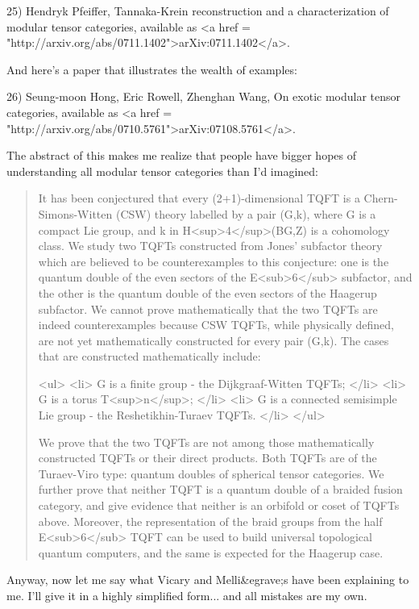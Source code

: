 25) Hendryk Pfeiffer, Tannaka-Krein reconstruction and a 
characterization of modular tensor categories, available as
<a href = "http://arxiv.org/abs/0711.1402">arXiv:0711.1402</a>.

And here's a paper that illustrates the wealth of examples:

26)  Seung-moon Hong, Eric Rowell, Zhenghan Wang, On exotic modular
tensor categories, available as <a href = "http://arxiv.org/abs/0710.5761">arXiv:07108.5761</a>.

The abstract of this makes me realize that people have bigger hopes of
understanding all modular tensor categories than I'd imagined:

\begin{quote}
  It has been conjectured that every (2+1)-dimensional TQFT is a
  Chern-Simons-Witten (CSW) theory labelled by a pair (G,k), where G
  is a compact Lie group, and k in H<sup>4</sup>(BG,Z) is a cohomology
  class.  We study two TQFTs constructed from Jones' subfactor theory
  which are believed to be counterexamples to this conjecture: one is
  the quantum double of the even sectors of the E<sub>6</sub>
  subfactor, and the other is the quantum double of the even sectors
  of the Haagerup subfactor. We cannot prove mathematically that the
  two TQFTs are indeed counterexamples because CSW TQFTs, while
  physically defined, are not yet mathematically constructed for every
  pair (G,k).  The cases that are constructed mathematically include:

<ul>
<li>
  G is a finite group - the Dijkgraaf-Witten TQFTs; 
</li>
<li>
  G is a torus T<sup>n</sup>;
</li>
<li>
  G is a connected semisimple Lie group - the Reshetikhin-Turaev TQFTs.
</li>
</ul>

  We prove that the two TQFTs are not among those mathematically
  constructed TQFTs or their direct products.  Both TQFTs are of the
  Turaev-Viro type: quantum doubles of spherical tensor categories.
  We further prove that neither TQFT is a quantum double of a braided
  fusion category, and give evidence that neither is an orbifold or
  coset of TQFTs above. Moreover, the representation of the braid
  groups from the half E<sub>6</sub> TQFT can be used to build
  universal topological quantum computers, and the same is expected
  for the Haagerup case.
\end{quote}
    

Anyway, now let me say what Vicary and Melli&egrave;s have been explaining 
to me.  I'll give it in a highly simplified form... and all mistakes
are my own.


